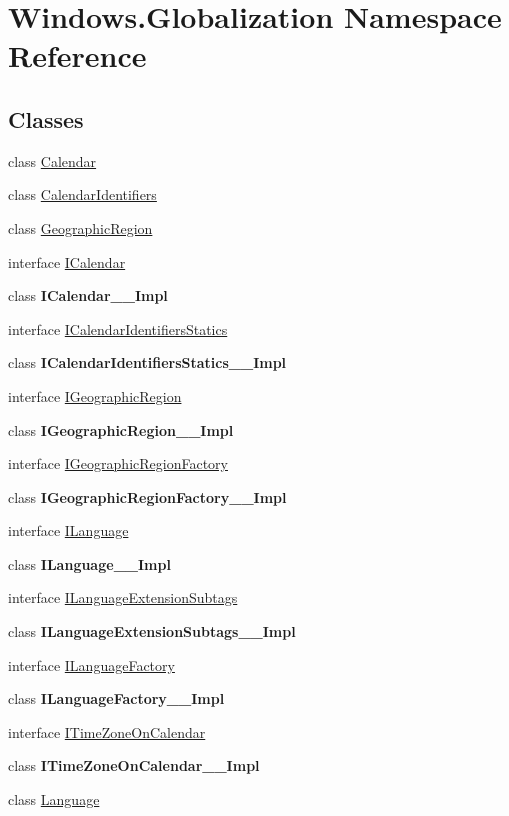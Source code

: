 \hypertarget{namespace_windows_1_1_globalization}{}\section{Windows.\+Globalization Namespace Reference}
\label{namespace_windows_1_1_globalization}
\subsection*{Classes}
\begin{DoxyCompactItemize}
\item 
class \hyperlink{class_windows_1_1_globalization_1_1_calendar}{Calendar}
\item 
class \hyperlink{class_windows_1_1_globalization_1_1_calendar_identifiers}{Calendar\+Identifiers}
\item 
class \hyperlink{class_windows_1_1_globalization_1_1_geographic_region}{Geographic\+Region}
\item 
interface \hyperlink{interface_windows_1_1_globalization_1_1_i_calendar}{I\+Calendar}
\item 
class {\bfseries I\+Calendar\+\_\+\+\_\+\+Impl}
\item 
interface \hyperlink{interface_windows_1_1_globalization_1_1_i_calendar_identifiers_statics}{I\+Calendar\+Identifiers\+Statics}
\item 
class {\bfseries I\+Calendar\+Identifiers\+Statics\+\_\+\+\_\+\+Impl}
\item 
interface \hyperlink{interface_windows_1_1_globalization_1_1_i_geographic_region}{I\+Geographic\+Region}
\item 
class {\bfseries I\+Geographic\+Region\+\_\+\+\_\+\+Impl}
\item 
interface \hyperlink{interface_windows_1_1_globalization_1_1_i_geographic_region_factory}{I\+Geographic\+Region\+Factory}
\item 
class {\bfseries I\+Geographic\+Region\+Factory\+\_\+\+\_\+\+Impl}
\item 
interface \hyperlink{interface_windows_1_1_globalization_1_1_i_language}{I\+Language}
\item 
class {\bfseries I\+Language\+\_\+\+\_\+\+Impl}
\item 
interface \hyperlink{interface_windows_1_1_globalization_1_1_i_language_extension_subtags}{I\+Language\+Extension\+Subtags}
\item 
class {\bfseries I\+Language\+Extension\+Subtags\+\_\+\+\_\+\+Impl}
\item 
interface \hyperlink{interface_windows_1_1_globalization_1_1_i_language_factory}{I\+Language\+Factory}
\item 
class {\bfseries I\+Language\+Factory\+\_\+\+\_\+\+Impl}
\item 
interface \hyperlink{interface_windows_1_1_globalization_1_1_i_time_zone_on_calendar}{I\+Time\+Zone\+On\+Calendar}
\item 
class {\bfseries I\+Time\+Zone\+On\+Calendar\+\_\+\+\_\+\+Impl}
\item 
class \hyperlink{class_windows_1_1_globalization_1_1_language}{Language}
\end{DoxyCompactItemize}
